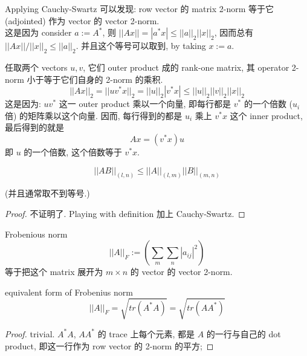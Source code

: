 \begin{example}
    Applying Cauchy-Swartz 可以发现: row vector 的 matrix 2-norm 等于它 (adjointed) 作为 vector 的 vector 2-norm.\\
    这是因为 consider $a := A^*$, 则 
    $||Ax|| = |a^* x| \leq ||a||_2 ||x||_2$, 因而总有 $||Ax|| / ||x||_2 \leq ||a||_2$. 并且这个等号可以取到, by taking $x := a$.
\end{example}



\begin{example}

    任取两个 vectors $u,v$, 它们 outer product 成的 rank-one matrix, 其 operator 2-norm 小于等于它们自身的 2-norm 的乘积.\\
    $$
    ||Ax||_2  = ||uv^* x||_2 = ||u||_2 |v^*x| \leq ||u||_2 ||v||_2 ||x||_2
    $$
    这是因为: $u  v^*$ 这一 outer product 乘以一个向量, 即每行都是 $v^*$ 的一个倍数 ($u_i$ 倍) 的矩阵乘以这个向量. 因而, 每行得到的都是 $u_i$ 乘上 $v^* x$ 这个 inner product, 最后得到的就是
    $$
    Ax = (v^*x) u
    $$
    即 $u$ 的一个倍数, 这个倍数等于 $v^* x$. 
\end{example}


\begin{example}
\begin{theorem}
\begin{equation}
    ||AB||_{(l,n)} \leq ||A||_{(l,m)} ||B||_{(m,n)}
\end{equation}
\end{theorem}
(并且通常取不到等号.)
\begin{proof}
    不证明了. Playing with definition 加上 Cauchy-Swartz.
\end{proof}
\end{example}


\begin{definition}{Frobenious norm}
    $$
    ||A||_F := (\sum_m \sum_n |a_{ij}|^2)
    $$
    等于把这个 matrix 展开为 $m\times n$ 的 vector 的 vector 2-norm.
\end{definition}


\begin{theorem}{equivalent form of Frobenius norm}
    \begin{equation}
        ||A||_F = \sqrt{tr(A^*A)} = \sqrt{tr(AA^*)}
    \end{equation}
\end{theorem}
\begin{proof}
    trivial. $A^*A$, $AA^*$ 的 trace 上每个元素, 都是 $A$ 的一行与自己的 dot product, 即这一行作为 row vector 的 2-norm 的平方; 
\end{proof}

